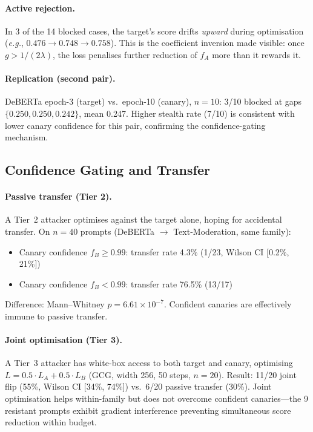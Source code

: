 \documentclass{article}
\newcommand{\eg}{\textit{e.g.}}
\begin{document}
\paragraph{Active rejection.} In 3 of the 14 blocked cases, the target's score drifts \emph{upward} during optimisation (\eg, $0.476 \to 0.748 \to 0.758$). This is the coefficient inversion made visible: once $g > 1/(2\lambda)$, the loss penalises further reduction of $f_A$ more than it rewards it.

\paragraph{Replication (second pair).} DeBERTa epoch-3 (target) vs.\ epoch-10 (canary), $n{=}10$: 3/10 blocked at gaps $\{0.250, 0.250, 0.242\}$, mean 0.247. Higher stealth rate (7/10) is consistent with lower canary confidence for this pair, confirming the confidence-gating mechanism.

\subsection{Confidence Gating and Transfer}
\label{sec:confidence-gating}

\paragraph{Passive transfer (Tier 2).} A Tier~2 attacker optimises against the target alone, hoping for accidental transfer. On $n = 40$ prompts (DeBERTa $\to$ Text-Moderation, same family):
\begin{itemize}
\item Canary confidence $f_B \geq 0.99$: transfer rate 4.3\% (1/23, Wilson CI [0.2\%, 21\%])
\item Canary confidence $f_B < 0.99$: transfer rate 76.5\% (13/17)
\end{itemize}
Difference: Mann--Whitney $p = 6.61 \times 10^{-7}$. Confident canaries are effectively immune to passive transfer.

\paragraph{Joint optimisation (Tier 3).} A Tier~3 attacker has white-box access to both target and canary, optimising $L = 0.5 \cdot L_A + 0.5 \cdot L_B$ (GCG, width 256, 50 steps, $n{=}20$). Result: 11/20 joint flip (55\%, Wilson CI [34\%, 74\%]) vs.\ 6/20 passive transfer (30\%). Joint optimisation helps within-family but does not overcome confident canaries---the 9 resistant prompts exhibit gradient interference preventing simultaneous score reduction within budget.
\end{document}
